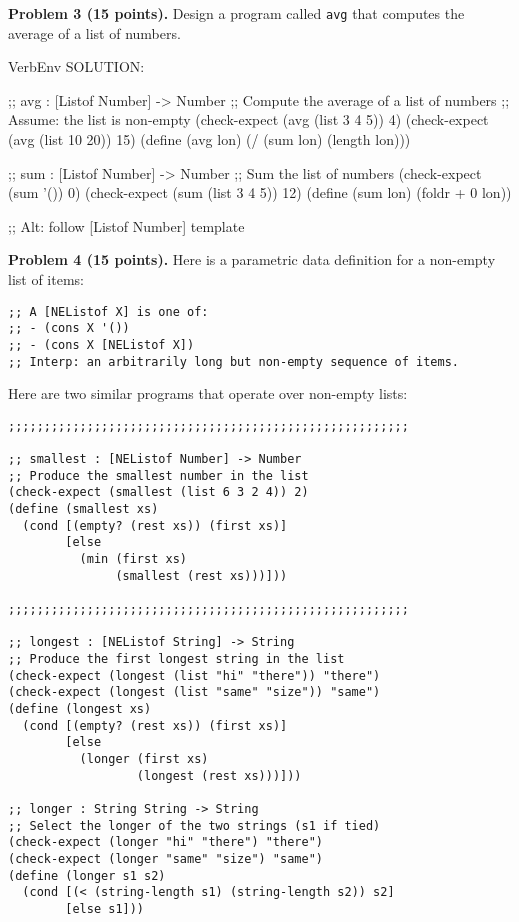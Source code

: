 \documentclass[12pt]{article}
\begin{document}
\newpage

\noindent
{\bf Problem 3 (15 points).}
%
Design a program called {\tt avg} that computes the average of a list of numbers.


\begin{SaveVerbatim}{VerbEnv}
SOLUTION:

;; avg : [Listof Number] -> Number
;; Compute the average of a list of numbers
;; Assume: the list is non-empty
(check-expect (avg (list 3 4 5)) 4)
(check-expect (avg (list 10 20)) 15)
(define (avg lon)
  (/ (sum lon) 
     (length lon)))

;; sum : [Listof Number] -> Number
;; Sum the list of numbers
(check-expect (sum '()) 0)
(check-expect (sum (list 3 4 5)) 12)
(define (sum lon)
  (foldr + 0 lon))

;; Alt: follow [Listof Number] template
\end{SaveVerbatim}



\newpage 
\noindent
{\bf Problem 4 (15 points).}
%
Here is a parametric data definition for a non-empty list of items:
\begin{verbatim}
;; A [NEListof X] is one of:
;; - (cons X '())
;; - (cons X [NEListof X])
;; Interp: an arbitrarily long but non-empty sequence of items.
\end{verbatim}
Here are two similar programs that operate over non-empty lists:
\begin{verbatim}
;;;;;;;;;;;;;;;;;;;;;;;;;;;;;;;;;;;;;;;;;;;;;;;;;;;;;;;;

;; smallest : [NEListof Number] -> Number
;; Produce the smallest number in the list
(check-expect (smallest (list 6 3 2 4)) 2)
(define (smallest xs)
  (cond [(empty? (rest xs)) (first xs)]
        [else
          (min (first xs)
               (smallest (rest xs)))]))

;;;;;;;;;;;;;;;;;;;;;;;;;;;;;;;;;;;;;;;;;;;;;;;;;;;;;;;;

;; longest : [NEListof String] -> String
;; Produce the first longest string in the list
(check-expect (longest (list "hi" "there")) "there")
(check-expect (longest (list "same" "size")) "same")
(define (longest xs)
  (cond [(empty? (rest xs)) (first xs)]
        [else
          (longer (first xs)
                  (longest (rest xs)))]))

;; longer : String String -> String
;; Select the longer of the two strings (s1 if tied)
(check-expect (longer "hi" "there") "there")
(check-expect (longer "same" "size") "same")
(define (longer s1 s2)
  (cond [(< (string-length s1) (string-length s2)) s2]
        [else s1]))
\end{verbatim}
\end{document}
